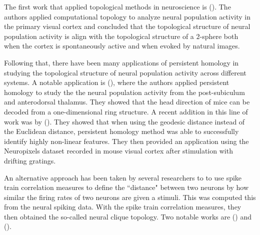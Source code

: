 The first work that applied topological methods in neuroscience is (\cite{singh_top_v1_2008}). The authors applied computational topology to analyze neural population activity in the primary visual cortex and concluded that the topological structure of neural population activity is align with the topological structure of a $2$-sphere both when the cortex is spontaneously active and when evoked by natural images.

Following that, there have been many applications of persistent homology in studying the topological structure of neural population activity across different systems. A notable application is (\cite{chaudhuri_intrinsic_2019}), where the authors applied persistent homology to study the the neural population activity from the post-subiculum and anterodorsal thalamus. They showed that the head direction of mice can be decoded from a one-dimensional ring structure. A recent addition in this line of work was by (\cite{beshkov_geodesic-based_2021}). They showed that when using the geodesic distance instead of the Euclidean distance, persistent homology method was able to successfully identify highly non-linear features. They then provided an application using the Neuropixels dataset recorded in mouse visual cortex after stimulation with drifting gratings.

An alternative approach has been taken by several researchers to to use spike train correlation measures to define the ``distance" between two neurons by how similar the firing rates of two neurons are given a stimuli. This was computed this from the neural spiking data. With the spike train correlation measures, they then obtained the so-called neural clique topology. Two notable works are  (\cite{giusti_clique_2015}) and (\cite{bardin_topological_2019}). 
